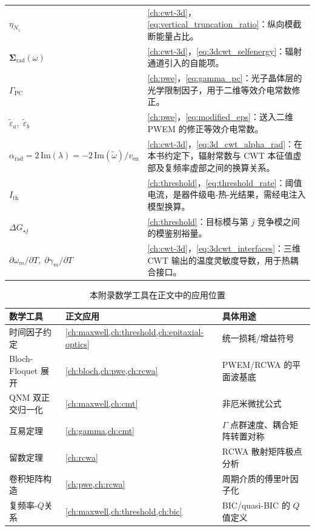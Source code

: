 \begin{longtable}{p{}p{}}
$\eta_{N_z}$ & \cref{ch:cwt-3d}，\cref{eq:vertical_truncation_ratio}：纵向模截断能量占比。 \\
$\mathbf{\Sigma}_{\mathrm{rad}}(\omega)$ & \cref{ch:cwt-3d}，\cref{eq:3dcwt_selfenergy}：辐射通道引入的自能项。 \\
$\Gamma_{\mathrm{PC}}$ & \cref{ch:pwe}，\cref{eq:gamma_pc}：光子晶体层的光学限制因子，用于二维等效介电常数修正。 \\
$\tilde\varepsilon_a,\;\tilde\varepsilon_b$ & \cref{ch:pwe}，\cref{eq:modified_eps}：送入二维 PWEM 的修正等效介电常数。 \\
$\alpha_{\mathrm{rad}}=2\,\mathrm{Im}(\lambda)=-2\,\mathrm{Im}(\tilde\omega)/v_{\mathrm{en}}$ & \cref{ch:cwt-3d}，\cref{eq:3d_cwt_alpha_rad}：在本书约定下，辐射常数与 CWT 本征值虚部及复频率虚部之间的换算关系。 \\
$I_{\mathrm{th}}$ & \cref{ch:threshold}，\cref{eq:threshold_rate}：阈值电流，是器件级电-热-光结果，需经电注入模型换算。 \\
$\Delta G_{\star j}$ & \cref{ch:threshold}：目标模与第 $j$ 竞争模之间的模鉴别裕量。 \\
$\partial\omega_m/\partial T,\;\partial\gamma_m/\partial T$ & \cref{ch:cwt-3d}，\cref{eq:3dcwt_interfaces}：三维 CWT 输出的温度灵敏度导数，用于热耦合接口。 \\
\bottomrule
\end{longtable}

\begin{table}[htbp]
  \centering
  \caption{本附录数学工具在正文中的应用位置}
  \begin{tabular}{l l l}
    \toprule
    数学工具 & 正文应用 & 具体用途 \\
    \midrule
    时间因子约定 & \cref{ch:maxwell,ch:threshold,ch:epitaxial-optics} & 统一损耗/增益符号 \\
    Bloch-Floquet 展开 & \cref{ch:bloch,ch:pwe,ch:rcwa} & PWEM/RCWA 的平面波基底 \\
    QNM 双正交归一化 & \cref{ch:maxwell,ch:cmt} & 非厄米微扰公式 \\
    互易定理 & \cref{ch:gamma,ch:cmt} & $\Gamma$ 点群速度、耦合矩阵转置对称 \\
    留数定理 & \cref{ch:rcwa} & RCWA 散射矩阵极点分析 \\
    卷积矩阵构造 & \cref{ch:pwe,ch:rcwa} & 周期介质的傅里叶因子化 \\
    复频率-$Q$关系 & \cref{ch:maxwell,ch:threshold,ch:bic} & BIC/quasi-BIC 的 $Q$ 值定义 \\
    \bottomrule
  \end{tabular}
\end{table}
